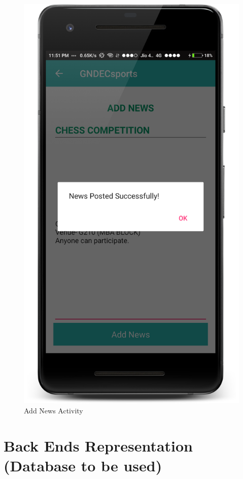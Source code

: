 \begin{figure}[ht]
\centering
\includegraphics[scale=0.20]{images/S11.png}
\caption{Add News Activity}
\end{figure}


\newpage
\section{Back Ends Representation (Database to be used)}
